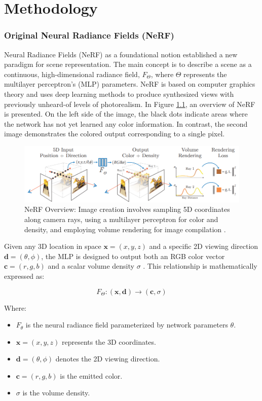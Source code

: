 \chapter{Methodology}\label{ch:Methodology}

\subsection{Original Neural Radiance Fields (NeRF)}
Neural Radiance Fields (NeRF) \cite{Mildenhall2020} as a foundational notion established a new paradigm for scene representation. The main concept is to describe a scene as a continuous, high-dimensional radiance field, $F_\Theta$, where $\Theta$ represents the multilayer perceptron's (MLP) parameters. NeRF is based on computer graphics theory and uses deep learning methods to produce synthesized views with previously unheard-of levels of photorealism. In Figure \ref{fig:Original NERF Overview}, an overview of NeRF is presented. On the left side of the image, the black dots indicate areas where the network has not yet learned any color information. In contrast, the second image demonstrates the colored output corresponding to a single pixel.

\begin{figure}[thbp]
    \centering
    \includegraphics[width=.9\textwidth]{img/Original Nerf.png}
    \caption{NeRF Overview: Image creation involves sampling 5D coordinates along camera rays, using a multilayer perceptron for color and density, and employing volume rendering for image compilation \cite{Mildenhall2020}.
}\label{fig:Original NERF Overview}
\end{figure}

Given any 3D location in space $\mathbf{x} = (x, y, z)$ and a specific 2D viewing direction $\mathbf{d} = (\theta, \phi)$, the MLP is designed to output both an RGB color vector $\mathbf{c} = (r, g, b)$ and a scalar volume density $\sigma$ \cite{Mildenhall2020}. This relationship is mathematically expressed as:

$$F_\Theta: (\mathbf{x}, \mathbf{d}) \rightarrow (\mathbf{c}, \sigma)$$

Where:
\begin{itemize}
    \item $F_{\theta}$ is the neural radiance field parameterized by network parameters $\theta$.
    \item $\mathbf{x} = (x, y, z)$ represents the 3D coordinates.
    \item $\mathbf{d} = (\theta, \phi)$ denotes the 2D viewing direction.
    \item $\mathbf{c} = (r, g, b)$ is the emitted color.
    \item $\sigma$ is the volume density.
\end{itemize}



